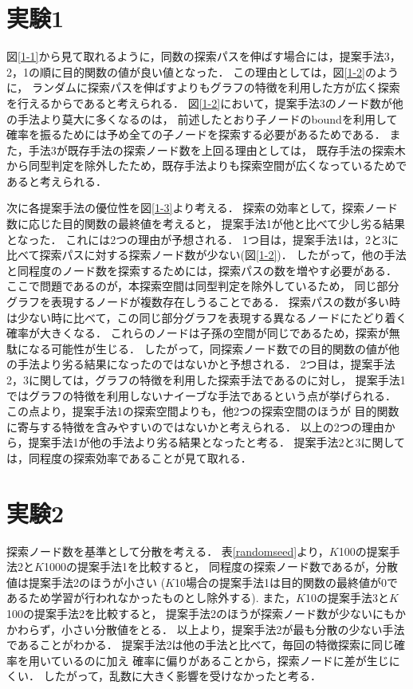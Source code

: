 \section{実験1}
図\ref{1-1}から見て取れるように，同数の探索パスを伸ばす場合には，提案手法3，2，1の順に目的関数の値が良い値となった．
この理由としては，図\ref{1-2}のように，
ランダムに探索パスを伸ばすよりもグラフの特徴を利用した方が広く探索を行えるからであると考えられる．
図\ref{1-2}において，提案手法3のノード数が他の手法より莫大に多くなるのは，
前述したとおり子ノードのboundを利用して確率を振るためには予め全ての子ノードを探索する必要があるためである．
また，手法3が既存手法の探索ノード数を上回る理由としては，
既存手法の探索木から同型判定を除外したため，既存手法よりも探索空間が広くなっているためであると考えられる．

次に各提案手法の優位性を図\ref{1-3}より考える．
探索の効率として，探索ノード数に応じた目的関数の最終値を考えると，
提案手法1が他と比べて少し劣る結果となった．
これには2つの理由が予想される．
1つ目は，提案手法1は，2と3に比べて探索パスに対する探索ノード数が少ない(図\ref{1-2})．
したがって，他の手法と同程度のノード数を探索するためには，探索パスの数を増やす必要がある．
ここで問題であるのが，本探索空間は同型判定を除外しているため，
同じ部分グラフを表現するノードが複数存在しうることである．
探索パスの数が多い時は少ない時に比べて，この同じ部分グラフを表現する異なるノードにたどり着く確率が大きくなる．
これらのノードは子孫の空間が同じであるため，探索が無駄になる可能性が生じる．
したがって，同探索ノード数での目的関数の値が他の手法より劣る結果になったのではないかと予想される．
2つ目は，提案手法2，3に関しては，グラフの特徴を利用した探索手法であるのに対し，
提案手法1ではグラフの特徴を利用しないナイーブな手法であるという点が挙げられる．
この点より，提案手法1の探索空間よりも，他2つの探索空間のほうが
目的関数に寄与する特徴を含みやすいのではないかと考えられる．
以上の2つの理由から，提案手法1が他の手法より劣る結果となったと考る．
提案手法2と3に関しては，同程度の探索効率であることが見て取れる．

\section{実験2}
探索ノード数を基準として分散を考える．
表\ref{randomseed}より，$K$100の提案手法2と$K$1000の提案手法1を比較すると，
同程度の探索ノード数であるが，分散値は提案手法2のほうが小さい
($K$10場合の提案手法1は目的関数の最終値が0であるため学習が行われなかったものとし除外する).
また，$K$10の提案手法3と$K$100の提案手法2を比較すると，
提案手法2のほうが探索ノード数が少ないにもかかわらず，小さい分散値をとる．
以上より，提案手法2が最も分散の少ない手法であることがわかる．
提案手法2は他の手法と比べて，毎回の特徴探索に同じ確率を用いているのに加え
確率に偏りがあることから，探索ノードに差が生じにくい．
したがって，乱数に大きく影響を受けなかったと考る．

